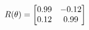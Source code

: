 \documentclass[preview]{standalone}
\begin{document}
\begin{align*}
\special{dvisvgm:raw <g id='unique000'>}R(\theta) = \begin{bmatrix}0.99 & -0.12\\0.12 & 0.99\end{bmatrix}\special{dvisvgm:raw </g>}
\end{align*}
\end{document}
